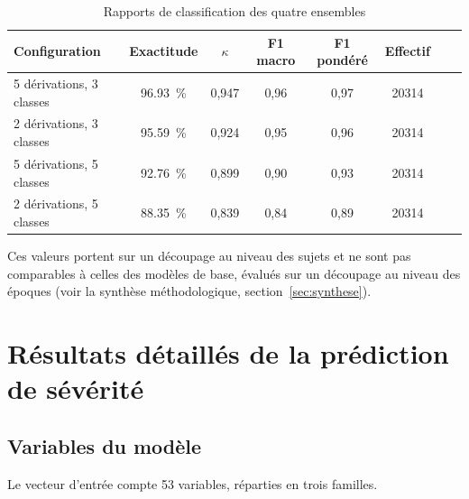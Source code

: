 \begin{table}[H]
\centering
\caption{Rapports de classification des quatre ensembles}
\label{tab:ann-rapport-stack}
\small
\begin{tabular}{@{}lccccccc@{}}
\toprule
\textbf{Configuration} & \textbf{Exactitude} & \textbf{$\kappa$} &
\textbf{F1 macro} & \textbf{F1 pondéré} & \textbf{Effectif} \\
\midrule
5 dérivations, 3 classes & \SI{96,93}{\percent} & 0,947 & 0,96 & 0,97 & \num{20314} \\
2 dérivations, 3 classes & \SI{95,59}{\percent} & 0,924 & 0,95 & 0,96 & \num{20314} \\
5 dérivations, 5 classes & \SI{92,76}{\percent} & 0,899 & 0,90 & 0,93 & \num{20314} \\
2 dérivations, 5 classes & \SI{88,35}{\percent} & 0,839 & 0,84 & 0,89 & \num{20314} \\
\bottomrule
\end{tabular}
\vspace{2pt}
\raggedright\footnotesize
Ces valeurs portent sur un découpage au niveau des sujets et ne sont pas comparables
à celles des modèles de base, évalués sur un découpage au niveau des époques
(voir la synthèse méthodologique, section~\ref{sec:synthese}).
\end{table}

\clearpage
\chapter{Résultats détaillés de la prédiction de sévérité}
\label{annexe:osa}

\section{Variables du modèle}

Le vecteur d'entrée compte 53 variables, réparties en trois familles.

